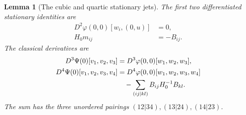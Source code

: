\documentclass[11pt,reqno]{amsart}
\numberwithin{equation}{section}
\newtheorem{lemma}[theorem]{Lemma}
\theoremstyle{definition}
\theoremstyle{remark}
\begin{document}
\begin{lemma}[The cubic and quartic stationary jets]
\label{lem:matching-classical-jets}
The first two differentiated stationary identities are
\begin{equation}
 \begin{split}
 D^2\varphi(0,0)[w_i,(0,u)]&=0,\\
                         H_0m_{ij}&=-B_{ij}.
 \end{split}
 \label{eq:matching-stationary-identities}
\end{equation}
The classical derivatives are
\begin{align}
 D^3\Psi(0)[v_1,v_2,v_3]
    &=D^3\varphi(0,0)[w_1,w_2,w_3],\notag\\
 D^4\Psi(0)[v_1,v_2,v_3,v_4]
    &=D^4\varphi(0,0)[w_1,w_2,w_3,w_4]\notag\\
    &\quad-\sum_{(ij|kl)}B_{ij}H_0^{-1}B_{kl}.
 \label{eq:matching-classical-jets}
\end{align}
The sum has the three unordered pairings
\((12|34),(13|24),(14|23)\).
\end{lemma}
\end{document}
